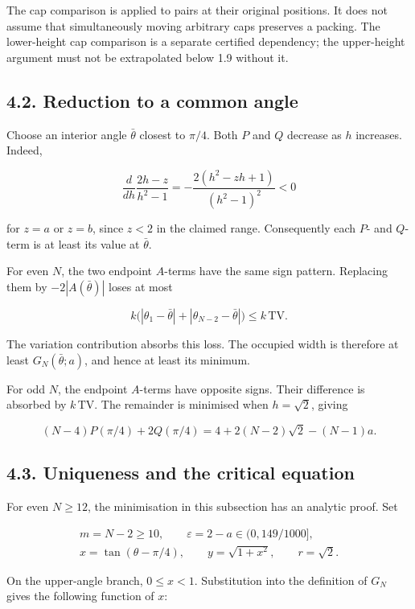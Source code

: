 \documentclass[
  11pt,
  a4paper,
]{article}
\begin{document}
The cap comparison is applied to pairs at their original positions. It
does not assume that simultaneously moving arbitrary caps preserves a
packing. The lower-height cap comparison is a separate certified
dependency; the upper-height argument must not be extrapolated below 1.9
without it.

\subsection{4.2. Reduction to a common
angle}\label{reduction-to-a-common-angle}

Choose an interior angle \(\bar\theta\) closest to \(\pi/4\). Both \(P\)
and \(Q\) decrease as \(h\) increases. Indeed,

\[
\frac{d}{dh}\frac{2h-z}{h^2-1}
=-\frac{2(h^2-zh+1)}{(h^2-1)^2}<0
\]

for \(z=a\) or \(z=b\), since \(z<2\) in the claimed range. Consequently
each \(P\)- and \(Q\)-term is at least its value at \(\bar\theta\).

For even \(N\), the two endpoint \(A\)-terms have the same sign pattern.
Replacing them by \(-2|A(\bar\theta)|\) loses at most

\[
k\bigl(|\theta_1-\bar\theta|+|\theta_{N-2}-\bar\theta|\bigr)
\le k\,\mathrm{TV}.
\]

The variation contribution absorbs this loss. The occupied width is
therefore at least \(G_N(\bar\theta;a)\), and hence at least its
minimum.

For odd \(N\), the endpoint \(A\)-terms have opposite signs. Their
difference is absorbed by \(k\,\mathrm{TV}\). The remainder is minimised
when \(h=\sqrt2\), giving

\[
(N-4)P(\pi/4)+2Q(\pi/4)
=4+2(N-2)\sqrt2-(N-1)a.
\]

\subsection{4.3. Uniqueness and the critical equation}\label{uniqueness-and-the-critical-equation}

For even \(N\ge12\), the minimisation in this subsection has an analytic proof. Set

\[
\begin{gathered}
m=N-2\ge10,\qquad \varepsilon=2-a\in(0,149/1000],\\
x=\tan(\theta-\pi/4),\qquad y=\sqrt{1+x^2},\qquad r=\sqrt2.
\end{gathered}
\]

On the upper-angle branch, \(0\le x<1\). Substitution into the definition of
\(G_N\) gives the following function of \(x\):
\end{document}
